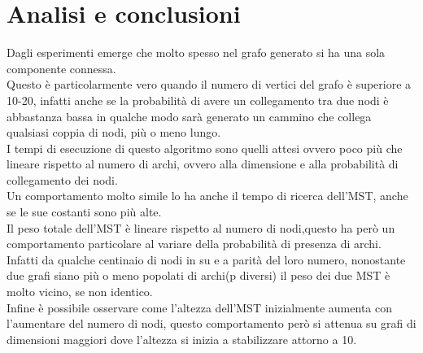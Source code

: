 \documentclass[]{article}
\begin{document}
\section{Analisi e conclusioni}
Dagli esperimenti emerge che molto spesso nel grafo generato si ha una sola componente connessa.\\
Questo è particolarmente vero quando il numero di vertici del grafo è superiore a 10-20, infatti anche se la probabilità di avere un collegamento tra due nodi è abbastanza bassa in qualche modo sarà generato un cammino che collega qualsiasi coppia di nodi, più o meno lungo.\\
I tempi di esecuzione di questo algoritmo sono quelli attesi ovvero poco più che lineare rispetto al numero di archi, ovvero alla dimensione e alla probabilità di collegamento dei nodi.\\
Un comportamento molto simile lo ha anche il tempo di ricerca dell'MST, anche se le sue costanti sono più alte.\\
Il peso totale dell'MST è lineare rispetto al numero di nodi,questo ha però un comportamento particolare al variare della probabilità di presenza di archi.\\
Infatti da qualche centinaio di nodi in su e a parità del loro numero, nonostante due grafi siano più o meno popolati di archi(p diversi) il peso dei due MST è molto vicino, se non identico.\\
Infine è possibile osservare come l'altezza dell'MST inizialmente aumenta con l'aumentare del numero di nodi, questo comportamento però si attenua su grafi di dimensioni maggiori dove l'altezza si inizia a stabilizzare attorno a 10.\\
 
\end{document}
